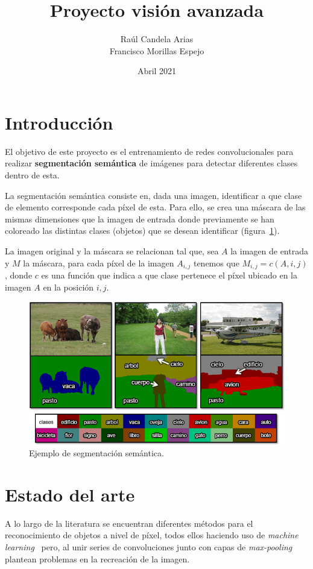\documentclass[a4paper]{article}
\title{Proyecto visión avanzada}
\author{Raúl Candela Arias \\ Francisco Morillas Espejo}
\date{Abril 2021}
\newcommand\imgScale {0.6}
\begin{document}
\maketitle

\section{Introducción}

El objetivo de este proyecto es el entrenamiento de redes convolucionales para realizar \textbf{segmentación semántica} de imágenes para detectar diferentes clases dentro de esta.
\newline

La segmentación semántica consiste en, dada una imagen, identificar a que clase de elemento corresponde cada píxel de esta.
Para ello, se crea una máscara de las mismas dimensiones que la imagen de entrada donde previamente se han coloreado las distintas clases (objetos) que se desean identificar (figura~\ref{fig:semanticSeg}).
\newline

La imagen original y la máscara se relacionan tal que, sea $A$ la imagen de entrada y $M$ la máscara, para cada píxel de la imagen $A_{i,j}$ tenemos que $M_{i,j} = c(A,i,j)$, donde $c$ es una función que indica a que clase pertenece el píxel ubicado en la imagen $A$ en la posición $i,j$.
\begin{figure}[htbp]
    \centering
    \includegraphics[scale=\imgScale]{img/EjSegSem.png}
    \caption{\small Ejemplo de segmentación semántica. \cite{Ref1}}
    \label{fig:semanticSeg}
\end{figure}

\section{Estado del arte}
A lo largo de la literatura se encuentran diferentes métodos para el reconocimiento de objetos a nivel de píxel, todos ellos haciendo uso de \textit{machine learning}~\cite{fabaret, long} pero, al unir series de convoluciones junto con capas de \textit{max-pooling} plantean problemas en la recreaci\'on de la imagen.
\newline
\end{document}
